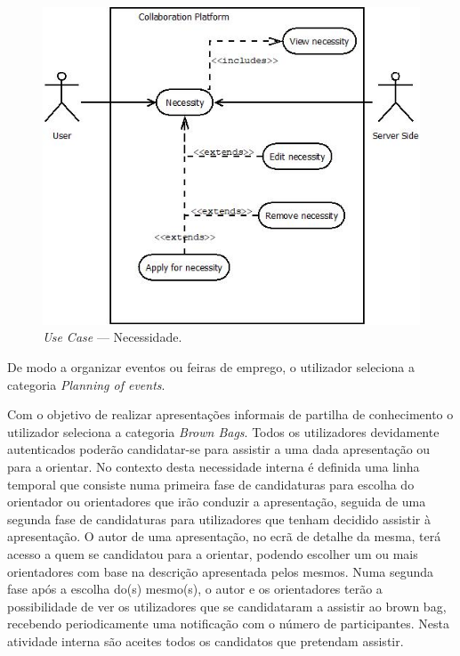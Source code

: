\begin{figure}[H]
    \centering
    \includegraphics[scale=0.6]{figures/Necessity.jpeg}
    \caption{\textit{Use Case} --- Necessidade.}\label{fig:uc:necessity}
\end{figure}

De modo a organizar eventos ou feiras de emprego, o utilizador seleciona a categoria \textit{Planning of events}.

Com o objetivo de realizar apresentações informais de partilha de conhecimento o utilizador seleciona a categoria \textit{Brown Bags}. 
Todos os utilizadores devidamente autenticados poderão candidatar-se para assistir a uma dada apresentação ou para a orientar. 
No contexto desta necessidade interna é definida uma linha temporal que consiste numa primeira fase de candidaturas para escolha do orientador 
ou orientadores que irão conduzir a apresentação, seguida de uma segunda fase de candidaturas para utilizadores que tenham decidido assistir à apresentação. 
O autor de uma apresentação, no ecrã de detalhe da mesma, terá acesso a quem se candidatou para a orientar, podendo escolher um ou mais orientadores 
com base na descrição apresentada pelos mesmos. 
Numa segunda fase após a escolha do(s) mesmo(s), o autor e os orientadores terão a possibilidade de ver os utilizadores que se 
candidataram a assistir ao brown bag, recebendo periodicamente uma notificação com o número de participantes. 
Nesta atividade interna são aceites todos os candidatos que pretendam assistir.

